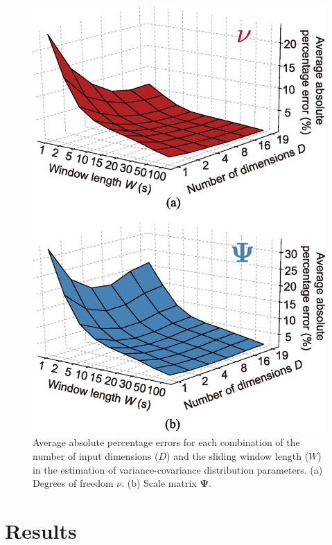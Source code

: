 \documentclass[journal]{IEEEtran}
\begin{document}
\begin{figure}[!t]
\centering
\includegraphics[width=0.8\hsize]{figure/AAPE_color_dim_fro_time_ver3.eps}
\caption{Average absolute percentage errors for each combination of the number of input dimensions ($D$) and the sliding window length ($W$) in the estimation of variance-covariance distribution parameters. (a) Degrees of freedom $\nu$. (b) Scale matrix $\mathbf{\Psi}$.}
\label{fig:ES_param}
\end{figure}

\section{Results}
\end{document}
